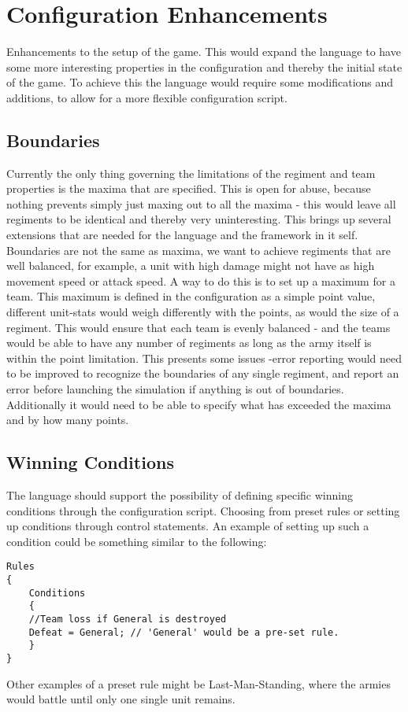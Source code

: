 \section{Configuration Enhancements}
Enhancements to the setup of the game. This would expand the language to have some more interesting properties in the configuration and thereby the initial state of the game. To achieve this the language would require some modifications and additions, to allow for a more flexible configuration script.

\subsection{Boundaries}
Currently the only thing governing the limitations of the regiment and team properties is the maxima that are specified. This is open for abuse, because nothing prevents simply just maxing out to all the maxima - this would leave all regiments to be identical and thereby very uninteresting. This brings up several extensions that are needed for the language and the framework in it self. Boundaries are not the same as maxima, we want to achieve regiments that are well balanced, for example, a unit with high damage might not have as high movement speed or attack speed. A way to do this is to set up a maximum for a team. This maximum is defined in the configuration as a simple point value, different unit-stats would weigh differently with the points, as would the size of a regiment. This would ensure that each team is evenly balanced - and the teams would be able to have any number of regiments as long as the army itself is within the point limitation.
This presents some issues -error reporting would need to be improved to recognize the boundaries of any single regiment, and report an error before launching the simulation if anything is out of boundaries. Additionally it would need to be able to specify what has exceeded the maxima and by how many points.
\subsection{Winning Conditions}
The language should support the possibility of defining specific winning conditions through the configuration script. Choosing from preset rules or setting up conditions through control statements.
An example of setting up such a condition could be something similar to the following:

\begin{lstlisting}
Rules
{
	Conditions
	{
	//Team loss if General is destroyed
	Defeat = General; // 'General' would be a pre-set rule.
	}
}
\end{lstlisting}
Other examples of a preset rule might be Last-Man-Standing, where the armies would battle until only one single unit remains.

